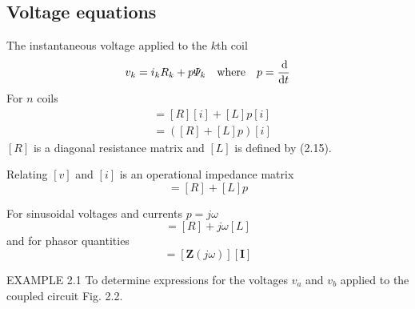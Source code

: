 \documentclass[a4paper,numbers=noenddot,12pt]{scrbook}
\begin{document}
        \subsection{Voltage equations}
        The instantaneous voltage applied to the $k$th coil
        \begin{equation}
            v_k = i_k R_k + p \varPsi_k \quad \text{where} \quad p = \dfrac{\dif}{\dif t}
            \label{eq:Eq2.17}
        \end{equation}
        For $n$ coils
        \begin{align}
            [v] & = [R][i] + [L]p[i] \nonumber \\
            & = ([R] + [L] p)[i]
            \label{eq:Eq2.18}
        \end{align}
        $[R]$ is a diagonal resistance matrix and $[L]$ is defined by (2.15).

        Relating $[v]$ and $[i]$ is an operational impedance matrix
        \begin{equation}
            [Z(p)] = [R] + [L]p
            \label{eq:Eq2.19}
        \end{equation}

        For sinusoidal voltages and currents $p = j \omega$
        \begin{equation}
            [\mathbf{Z} (j \omega)] = [R] + j \omega[L]
            \label{eq:Eq2.20}
        \end{equation}
        and for phasor quantities
        \begin{equation}
            [\mathbf{V}] = [\mathbf{Z} (j \omega)] [\mathbf{I}]
            \label{eq:Eq2.21}
        \end{equation}

        \textsc{EXAMPLE} 2.1 To determine expressions for the voltages $v_a$ and $v_b$ applied to the coupled circuit Fig. 2.2.
\end{document}
